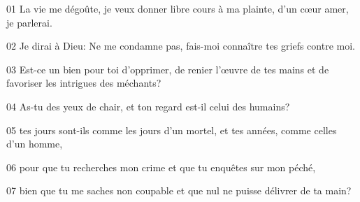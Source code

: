 01 La vie me dégoûte, je veux donner libre cours à ma plainte, d’un cœur amer, je parlerai.

02 Je dirai à Dieu: Ne me condamne pas, fais-moi connaître tes griefs contre moi.

03 Est-ce un bien pour toi d’opprimer, de renier l’œuvre de tes mains et de favoriser les intrigues des méchants?

04 As-tu des yeux de chair, et ton regard est-il celui des humains?

05 tes jours sont-ils comme les jours d’un mortel, et tes années, comme celles d’un homme,

06 pour que tu recherches mon crime et que tu enquêtes sur mon péché,

07 bien que tu me saches non coupable et que nul ne puisse délivrer de ta main?